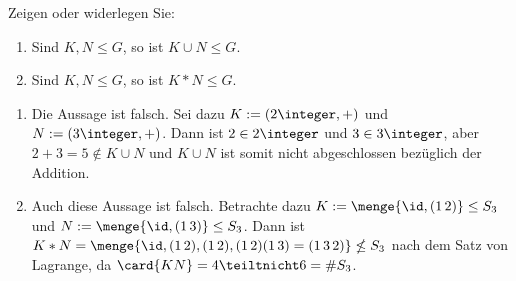\begin{uebungsblatt}
\begin{uebung} [Präsenz]
	Zeigen oder widerlegen Sie:
	\begin{enumerate}
		\item Sind $K,N \leq G$, so ist $K \cup N \leq G$.
		\item Sind $K,N \leq G$, so ist $K * N \leq G$.
	\end{enumerate}
\end{uebung}
\begin{loesung}
	\begin{enumerate}
		\item Die Aussage ist falsch. Sei dazu $K := (2\integer, +)$ und $N := (3\integer, +)$. Dann ist $2 \in 2\integer$ und $3 \in 3\integer$, aber $2+3 = 5 \notin K \cup N$ und $K \cup N$ ist somit nicht abgeschlossen bezüglich der Addition.
		\item Auch diese Aussage ist falsch. Betrachte dazu $K:= \menge{\id , (1 \, 2)} \leq S_3$ und $N := \menge{\id , (1 \, 3)} \leq S_3$. Dann ist $K*N = \menge{\id, (1 \, 2), (1 \, 2), (1 \, 2)(1 \, 3) = (1 \, 3 \, 2)} \nleq S_3$ nach dem Satz von Lagrange, da $\card{KN} = 4 \teiltnicht 6 = \# S_3$.
	\end{enumerate}
\end{loesung}

\end{uebungsblatt}